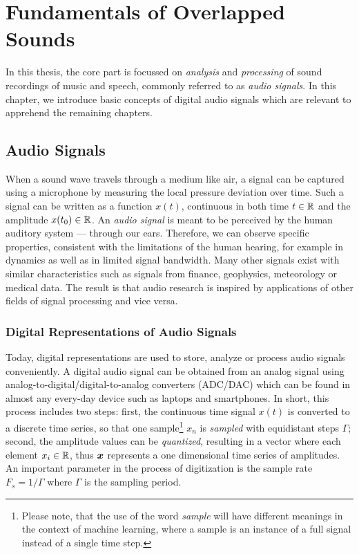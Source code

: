 \hypertarget{Fundamentals of Overlapped Sounds}{%
\chapter{Fundamentals of Overlapped Sounds}\label{cha:fundamentals}}

In this thesis, the core part is focussed on \emph{analysis} and \emph{processing} of sound recordings of music and speech, commonly referred to as \emph{audio signals}.
In this chapter, we introduce basic concepts of digital audio signals which are relevant to apprehend the remaining chapters.

\hypertarget{Audio Signals}{%
\section{Audio Signals}\label{sec:specifics-of-audio-signals}}

When a sound wave travels through a medium like air, a signal can be captured using a microphone by measuring the local pressure deviation over time.
Such a signal can be written as a function \(x(t)\), continuous in both time \(t \in {\mathbb{R}}\) and the amplitude \(x(t_0) \in {\mathbb{R}}\).
An \emph{audio signal} is meant to be perceived by the human auditory system --- through our ears.
Therefore, we can observe specific properties, consistent with the limitations of the human hearing, for example in dynamics as well as in limited signal bandwidth.
Many other signals exist with similar characteristics such as signals from finance, geophysics, meteorology or medical data.
The result is that audio research is inspired by applications of other fields of signal processing and vice versa.

\hypertarget{digital-representations-of-audio-signals}{%
\subsection{Digital Representations of Audio
Signals}\label{digital-representations-of-audio-signals}}

Today, digital representations are used to store, analyze or process audio signals conveniently.
A digital audio signal can be obtained from an analog signal using analog-to-digital/digital-to-analog converters (ADC/DAC) which can be found in almost any every-day device such as laptops and smartphones.
In short, this process includes two steps: 
first, the continuous time signal \(x(t)\) is converted to a discrete time series, so that one sample\footnote{Please note, that the use of the word \emph{sample} will have different meanings in the context of machine learning, where a sample is an instance of a full signal instead of a single time step.} \(x_n\) is \emph{sampled} with equidistant steps \(\Gamma\); 
second, the amplitude values can be \emph{quantized}, resulting in a vector where each element \(x_i \in {\mathbb{R}}\), thus \({\bm{x}}\) represents a one dimensional time series of amplitudes.
An important parameter in the process of digitization is the sample rate \(F_s = 1/\Gamma\) where \(\Gamma\) is the sampling period.

